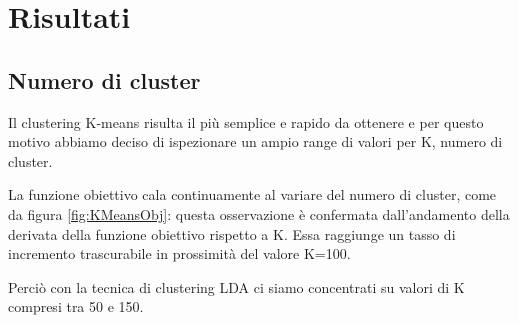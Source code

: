 \documentclass[
	12pt, %
	a4paper, %
	oneside, %
	headinclude,footinclude, %
	BCOR5mm, %
]{scrartcl}
\begin{document}
\section{Risultati}

	\subsection{Numero di cluster}
		Il clustering K-means risulta il più semplice e rapido da ottenere e per questo motivo abbiamo deciso di ispezionare un ampio range di valori per K, numero di cluster.
		
		La funzione obiettivo cala continuamente al variare del numero di cluster, come da figura \ref{fig:KMeansObj}: questa osservazione è confermata dall'andamento della derivata della funzione obiettivo rispetto a K. Essa raggiunge un tasso di incremento trascurabile in prossimità del valore K=100.
		
		Perciò con la tecnica di clustering LDA ci siamo concentrati su valori di K compresi tra 50 e 150.
		
\end{document}
